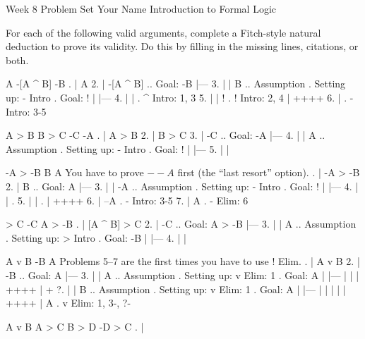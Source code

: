 

\heading
Week 8 Problem Set
Your Name
Introduction to Formal Logic
\endheading

For each of the following valid arguments, complete a Fitch-style natural deduction to prove its validity. Do this by filling in the missing lines, citations, or both.

\problems
{}
\argument
 A
 -[A ^ B]
\argumentline
 -B
\endargument
	\answer
	. | A
	 2. | -[A ^ B]  ..  Goal: -B
	    |---
	 3. |  | B      ..  Assumption  .  Setting up: - Intro  .  Goal: !
	    |  |---
	 4. |  |        .  ^ Intro: 1, 3
	 5. |  | !      .  ! Intro: 2, 4
	    |  ++++
	 6. |           .  - Intro: 3-5
	\endfitchproof
	\endanswer

\argument
 A > B
 B > C
 -C
\argumentline
 -A
\endargument
	\answer
	. | A > B
	 2. | B > C
	 3. | -C     ..  Goal: -A
	    |---
	 4. |  | A   ..  Assumption  .  Setting up: - Intro  .  Goal: !
	    |  |---
	 5. |  | 
	\endfitchproof
	\endanswer

\argument
 -A > -B
 B
\argumentline
 A
\endargument
\Hint You have to prove $--A$ first (the ``last resort'' option).
	\answer
	. | -A > -B
	 2. | B        ..  Goal: A
	    |---
	 3. |  | -A    ..  Assumption  .  Setting up: - Intro  .  Goal: !
	    |  |---
	 4. |  |       .  
	 5. |  |       .  
	    |  ++++
	 6. | --A      .  - Intro: 3-5
	 7. | A        .  - Elim: 6
	\endfitchproof
	\endanswer

\argument
 [A ^ B] > C
 -C
\argumentline
 A > -B
\endargument
	\answer
	. | [A ^ B] > C
	 2. | -C           .. Goal: A > -B
	    |---
	 3. |  | A         ..  Assumption  .  Setting up: > Intro  .  Goal: -B
	    |  |---
	 4. |  | 
	\endfitchproof
	\endanswer

\widerfitchsetup
{}
\argument
 A v B
 -B
\argumentline
 A
\endargument
\Hint Problems 5--7 are the first times you have to use $!$ Elim.
	\answer
	. | A v B
	 2. | -B     ..  Goal: A
	    |---
	 3. |  | A   ..  Assumption  .  Setting up: v Elim: 1  .  Goal: A
	    |  |---
	    |  | 
	    |  ++++
	    |  +
	 ?. |  | B   ..  Assumption  .  Setting up: v Elim: 1  .  Goal: A
	    |  |---
	    |  | 
	    |  | 
	    |  ++++
	    | A      .  v Elim: 1, 3-, ?-
	\endfitchproof
	\endanswer

\argument
 A v B
 A > C
 B > D
\argumentline
 -D > C
\endargument
	\answer
	. | 
	\endfitchproof
	\endanswer

